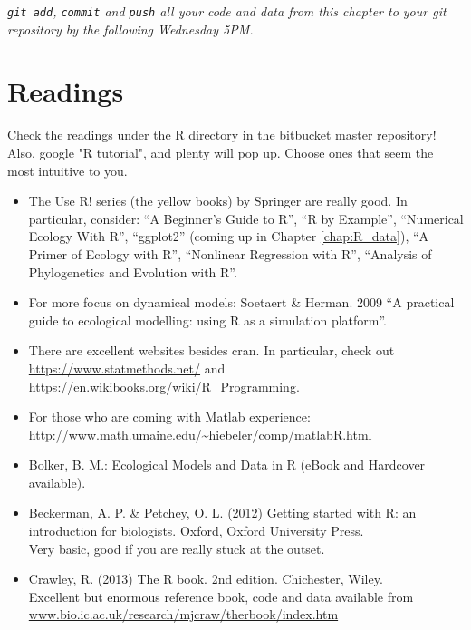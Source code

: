 \begin{center}
	\it {\tt git add}, {\tt commit} and {\tt push} all your code and data 
	from this chapter to your git repository by the {\it following 
	Wednesday 5PM}.
\end{center}

\section{Readings}
Check the readings under the R directory in the bitbucket master 
repository! Also, google "R tutorial", and plenty will pop up. Choose 
ones that seem the most intuitive to you.
\begin{itemize}\itemsep2pt
	\item The Use R! series (the yellow books) by Springer are really 
	good. In particular, consider: ``A Beginner's Guide to R'', ``R by 
	Example'', ``Numerical Ecology With R'', ``ggplot2'' (coming up in 
	Chapter \ref{chap:R_data}), ``A Primer of 
	Ecology with R'', ``Nonlinear Regression with R'', ``Analysis of 
	Phylogenetics and Evolution with R''.
	\item For more focus on dynamical models: Soetaert \& Herman. 2009 
	``A practical guide to ecological modelling: using R as a 
	simulation platform''.
	\item There are excellent websites besides cran. In particular, check out 
	\url{https://www.statmethods.net/} and  \url{https://en.wikibooks.org/wiki/R_Programming}. 	
	\item For those who are coming with Matlab experience:
      \url{http://www.math.umaine.edu/~hiebeler/comp/matlabR.html}
  \item Bolker, B. M.: Ecological Models and Data in R (eBook and 
    Hardcover available).
  \item Beckerman, A. P. \& Petchey, O. L. (2012) Getting started 
    with R: an introduction for biologists. Oxford, Oxford University 
    Press. \\ Very basic, good if you are really stuck at the outset. 
  \item Crawley, R. (2013) The R book. 2nd edition. Chichester, Wiley. \\
    Excellent but enormous reference book, code and data available from
    \url{www.bio.ic.ac.uk/research/mjcraw/therbook/index.htm}
	
\end{itemize}
